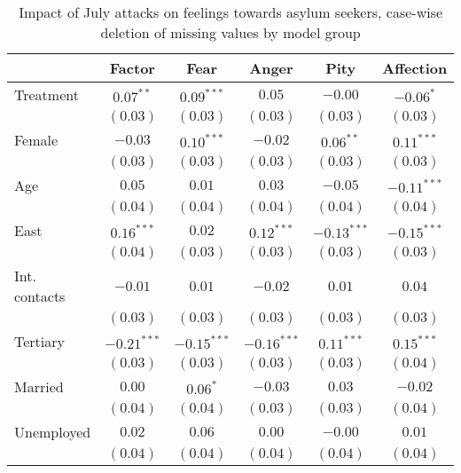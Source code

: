 
\begin{table}
\caption{Impact of July attacks on feelings towards asylum seekers, case-wise deletion of missing values by model group}
\begin{center}
\begin{tabular}{l c c c c c}
\toprule
 & Factor & Fear & Anger & Pity & Affection \\
\midrule
Treatment     & $0.07^{**}$   & $0.09^{***}$  & $0.05$        & $-0.00$       & $-0.06^{*}$   \\
              & $(0.03)$      & $(0.03)$      & $(0.03)$      & $(0.03)$      & $(0.03)$      \\
Female        & $-0.03$       & $0.10^{***}$  & $-0.02$       & $0.06^{**}$   & $0.11^{***}$  \\
              & $(0.03)$      & $(0.03)$      & $(0.03)$      & $(0.03)$      & $(0.03)$      \\
Age           & $0.05$        & $0.01$        & $0.03$        & $-0.05$       & $-0.11^{***}$ \\
              & $(0.04)$      & $(0.04)$      & $(0.04)$      & $(0.04)$      & $(0.04)$      \\
East          & $0.16^{***}$  & $0.02$        & $0.12^{***}$  & $-0.13^{***}$ & $-0.15^{***}$ \\
              & $(0.04)$      & $(0.03)$      & $(0.03)$      & $(0.03)$      & $(0.03)$      \\
Int. contacts & $-0.01$       & $0.01$        & $-0.02$       & $0.01$        & $0.04$        \\
              & $(0.03)$      & $(0.03)$      & $(0.03)$      & $(0.03)$      & $(0.03)$      \\
Tertiary      & $-0.21^{***}$ & $-0.15^{***}$ & $-0.16^{***}$ & $0.11^{***}$  & $0.15^{***}$  \\
              & $(0.03)$      & $(0.03)$      & $(0.03)$      & $(0.03)$      & $(0.04)$      \\
Married       & $0.00$        & $0.06^{*}$    & $-0.03$       & $0.03$        & $-0.02$       \\
              & $(0.04)$      & $(0.04)$      & $(0.03)$      & $(0.03)$      & $(0.04)$      \\
Unemployed    & $0.02$        & $0.06$        & $0.00$        & $-0.00$       & $0.01$        \\
              & $(0.04)$      & $(0.04)$      & $(0.04)$      & $(0.04)$      & $(0.04)$      \\
\midrule

\end{tabular}
\end{center}
\end{table}
